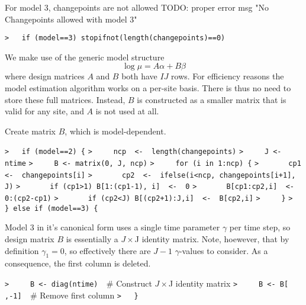 \documentclass[a4paper]{article}
\begin{document}
For model 3, changepoints are not allowed
TODO: proper error msg "No Changepoints allowed with model 3"\par
\verb~>   if (model==3) stopifnot(length(changepoints)==0)~\par

We make use of the generic model structure
$$ \log\mu = A\alpha + B\beta $$
where design matrices $A$ and $B$ both have $IJ$ rows.
For efficiency reasons the model estimation algorithm works on a per-site basis.
There is thus no need to store these full matrices. Instead, $B$ is constructed as a
smaller matrix that is valid for any site, and $A$ is not used at all.\par

Create matrix $B$, which is model-dependent.\par
\verb~>   if (model==2) {~\newline
\verb~>     ncp  <-  length(changepoints)~\newline
\verb~>     J <- ntime~\newline
\verb~>     B <- matrix(0, J, ncp)~\newline
\verb~>     for (i in 1:ncp) {~\newline
\verb~>       cp1  <-  changepoints[i]~\newline
\verb~>       cp2  <-  ifelse(i<ncp, changepoints[i+1], J)~\newline
\verb~>       if (cp1>1) B[1:(cp1-1), i]  <-  0~\newline
\verb~>       B[cp1:cp2,i]  <-  0:(cp2-cp1)~\newline
\verb~>       if (cp2<J) B[(cp2+1):J,i]  <-  B[cp2,i]~\newline
\verb~>     }~\newline
\verb~>   } else if (model==3) {~\par
Model 3 in it's canonical form uses a single time parameter $\gamma$ per time step,
so design matrix $B$ is essentially a $J\times$J identity matrix.
Note, hoewever, that by definition $\gamma_1=0$, so effectively there are $J-1$ $\gamma$-values to consider.
As a consequence, the first column is deleted.\par
\verb~>     B <- diag(ntime)  ~{\sffamily\# Construct $J\times$J identity matrix}\newline
\verb~>     B <- B[ ,-1]  ~{\sffamily\# Remove first column}\newline
\verb~>   }~\par
\end{document}
